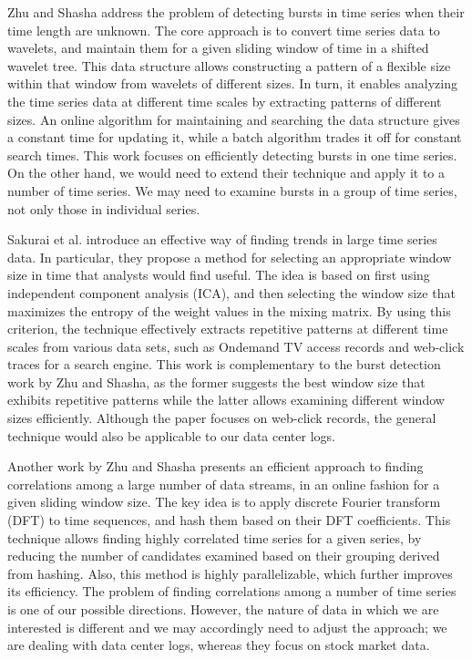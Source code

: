 Zhu and Shasha \cite{Zhu2003} address the problem of detecting bursts in time series when their time length are unknown. The core approach is to convert time series data to wavelets, and maintain them  for a given sliding window of time in a shifted wavelet tree. This data structure allows constructing a pattern of a flexible size within that window from wavelets of different sizes. In turn, it enables analyzing the time series data at different time scales by extracting patterns of different sizes. An online algorithm for maintaining and searching the data structure gives a constant time for updating it, while a batch algorithm trades it off for constant search times. This work focuses on efficiently detecting bursts in one time series. On the other hand, we would need to extend their technique and apply it to a number of time series. We may need to examine bursts in a group of time series, not only those in individual series.

Sakurai et al. \cite{Sakurai2011} introduce an effective way of finding trends in large time series data. In particular, they propose a method for selecting an appropriate window size in time that analysts would find useful. The idea is based on first using independent component analysis (ICA), and then selecting the window size that maximizes the entropy of the weight values in the mixing matrix. By using this criterion, the technique effectively extracts repetitive patterns at different time scales from various data sets, such as Ondemand TV access records and web-click traces for a search engine. This work is complementary to the burst detection work by Zhu and Shasha, as the former suggests the best window size that exhibits repetitive patterns while the latter allows examining different window sizes efficiently. Although the paper focuses on web-click records, the general technique would also be applicable to our data center logs.

Another work by Zhu and Shasha \cite{Zhu2002} presents an efficient approach to finding correlations among a large number of data streams, in an online fashion for a given sliding window size. The key idea is to apply discrete Fourier transform (DFT) to time sequences, and hash them based on their DFT coefficients. This technique allows finding highly correlated time series for a given series, by reducing the number of candidates examined based on their grouping derived from hashing. Also, this method is highly parallelizable, which further improves its efficiency. The problem of finding correlations among a number of time series is one of our possible directions. However, the nature of data in which we are interested is different and we may accordingly need to adjust the approach; we are dealing with data center logs, whereas they focus on stock market data.

